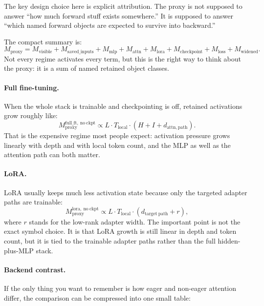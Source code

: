 The key design choice here is explicit attribution. The proxy is not supposed
to answer ``how much forward stuff exists somewhere.'' It is supposed to answer
``which named forward objects are expected to survive into backward.''

The compact summary is:
\[
M_{\mathrm{proxy}} =
M_{\mathrm{visible}}
+ M_{\mathrm{saved\_inputs}}
+ M_{\mathrm{mlp}}
+ M_{\mathrm{attn}}
+ M_{\mathrm{lora}}
+ M_{\mathrm{checkpoint}}
+ M_{\mathrm{loss}}
+ M_{\mathrm{widened}}.
\]
Not every regime activates every term, but this is the right way to think about
the proxy: it is a sum of named retained object classes.

\paragraph{Full fine-tuning.}
When the whole stack is trainable and checkpointing is off, retained
activations grow roughly like:
\[
M_{\mathrm{proxy}}^{\mathrm{full\_ft,\ no\ ckpt}}
\propto
L \cdot T_{\mathrm{local}} \cdot
\left(H + I + d_{\mathrm{attn,path}}\right).
\]
That is the expensive regime most people expect: activation pressure grows
linearly with depth and with local token count, and the MLP as well as the
attention path can both matter.

\paragraph{LoRA.}
LoRA usually keeps much less activation state because only the targeted adapter
paths are trainable:
\[
M_{\mathrm{proxy}}^{\mathrm{lora,\ no\ ckpt}}
\propto
L \cdot T_{\mathrm{local}} \cdot
\left(d_{\mathrm{target\ path}} + r\right),
\]
where $r$ stands for the low-rank adapter width. The important point is not the
exact symbol choice. It is that LoRA growth is still linear in depth and token
count, but it is tied to the trainable adapter paths rather than the full
hidden-plus-MLP stack.

\paragraph{Backend contrast.}
If the only thing you want to remember is how eager and non-eager attention
differ, the comparison can be compressed into one small table:

